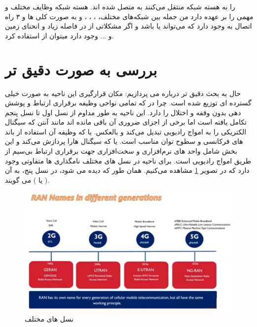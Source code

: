 \documentclass[landscape, 12pt]{report}
\begin{document}
                                  را به هسته شبکه منتقل می‌کنند به 
                                   متصل شده اند. 
هسته شبکه وظایف مختلف و مهمی را بر عهده دارد من جمله
  بین شبکه‌های مختلف،
   ،
    ،
     ،
       و به صورت کلی
         ها و ۳ راه اتصال
           به
             وجود دارد که می‌تواند
               یا
                 باشد و اگر مشکلاتی از در فاصله زیاد و انحنای زمین و ... وجود دارد میتوان از 
                   استفاده کرد.


\section*{بررسی 
به صورت دقیق تر
}
حال به بحث دقیق تر درباره
  می
  پردازیم:
مکان قرارگیری این ناحیه به صورت خیلی گسترده ای توزیع شده است. چرا در که تمامی نواحی وظیفه برقراری ارتباط و پوشش دهی بدون وقفه و اختلال را دارد.
این ناحیه به طور مداوم از نسل اول تا نسل پنجم تکامل یافته است اما برخی از اجزای ضروری آن باقی مانده اند مانند آنتن که سیگنال الکتریکی را به امواج رادیویی تبدیل می‌کند و بالعکس.
  یا
    که وظیفه آن استفاده از باند های فرکانسی و سطوح توان مناسب است.
      یا
       که سیگنال هارا پردازش می‌کند و این بخش شامل واحد های نرم‌افزاری و سخت‌افزاری جهت برقراری ارتباط بی‌سیم از طریق امواج رادیویی است.
برای ناحیه
  در نسل های مختلف نامگذاری ها متفاوتی وجود دارد که در تصویر \ref{fig:RAN_Generations} مشاهده می‌کنیم. همان طور که دیده می شود، در نسل پنج، به آن 
  (
  	یا
  )
  می گویند.
  \begin{figure}[ht]
  	\centering
  	\includegraphics[width=.6\linewidth]{Pic/RAN_Generations}
  	\caption{نسل های مختلف
  	}
  	\label{fig:RAN_Generations}
  \end{figure}
  
\end{document}
